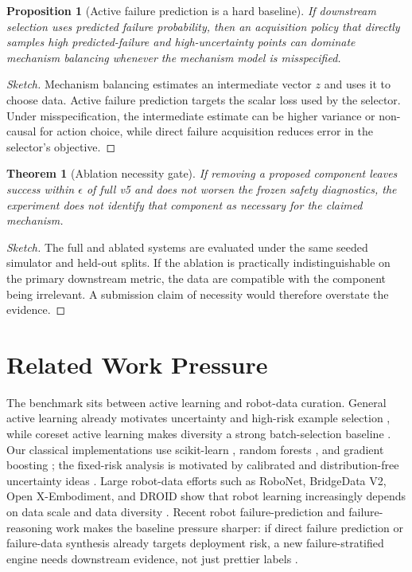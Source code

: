\documentclass{article}
\newtheorem{proposition}{Proposition}
\newtheorem{theorem}{Theorem}
\begin{document}
\begin{proposition}[Active failure prediction is a hard baseline]
If downstream selection uses predicted failure probability, then an acquisition policy that directly samples high predicted-failure and high-uncertainty points can dominate mechanism balancing whenever the mechanism model is misspecified.
\end{proposition}
\begin{proof}[Sketch]
Mechanism balancing estimates an intermediate vector $z$ and uses it to choose data. Active failure prediction targets the scalar loss used by the selector. Under misspecification, the intermediate estimate can be higher variance or non-causal for action choice, while direct failure acquisition reduces error in the selector's objective.
\end{proof}

\begin{theorem}[Ablation necessity gate]
If removing a proposed component leaves success within $\epsilon$ of full v5 and does not worsen the frozen safety diagnostics, the experiment does not identify that component as necessary for the claimed mechanism.
\end{theorem}
\begin{proof}[Sketch]
The full and ablated systems are evaluated under the same seeded simulator and held-out splits. If the ablation is practically indistinguishable on the primary downstream metric, the data are compatible with the component being irrelevant. A submission claim of necessity would therefore overstate the evidence.
\end{proof}

\section{Related Work Pressure}
The benchmark sits between active learning and robot-data curation. General active learning already motivates uncertainty and high-risk example selection \citep{settles2009active}, while coreset active learning makes diversity a strong batch-selection baseline \citep{sener2018active}. Our classical implementations use scikit-learn \citep{pedregosa2011scikit}, random forests \citep{breiman2001random}, and gradient boosting \citep{friedman2001greedy}; the fixed-risk analysis is motivated by calibrated and distribution-free uncertainty ideas \citep{angelopoulos2021gentle}. Large robot-data efforts such as RoboNet, BridgeData V2, Open X-Embodiment, and DROID show that robot learning increasingly depends on data scale and data diversity \citep{dasari2020robonet,walke2023bridgedata,oneill2023openx,khazatsky2024droid}. Recent robot failure-prediction and failure-reasoning work makes the baseline pressure sharper: if direct failure prediction or failure-data synthesis already targets deployment risk, a new failure-stratified engine needs downstream evidence, not just prettier labels \citep{romer2025fiper,pacaud2025guardian}.
\end{document}
